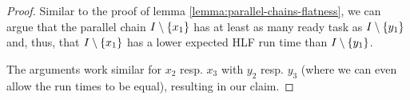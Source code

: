 \begin{proof}
  Similar to the proof of lemma \ref{lemma:parallel-chains-flatness}, we can argue that the parallel chain $I\setminus\{x_1\}$ has at least as many ready task as $I\setminus\{y_1\}$ and, thus, that $I\setminus\{x_1\}$ has a lower expected HLF run time than $I\setminus\{y_1\}$.

  The arguments work similar for $x_2$ resp. $x_3$ with $y_2$ resp. $y_3$ (where we can even allow the run times to be equal), resulting in our claim.

\end{proof}

